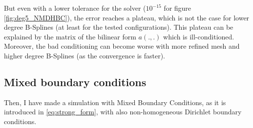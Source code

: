 \documentclass[a4paper,12pt,twoside]{report}
\begin{document}
But even with a lower tolerance for the solver ($10^{-15}$ for figure \ref{fig:deg5_NMDHBC}), the error reaches a plateau, which is not the case for lower degree B-Splines (at least for the tested configurations). This plateau can be explained by the matrix of the bilinear form $a(.,.)$ which is ill-conditioned. Moreover, the bad conditioning can become worse with more refined mesh and higher degree B-Splines (as the convergence is faster).

\subsection{Mixed boundary conditions}
\label{sec:mixed_BC}

Then, I have made a simulation with Mixed Boundary Conditions, as it is introduced in \eqref{eq:strong_form}, with also non-homogeneous Dirichlet boundary conditions.
\end{document}
